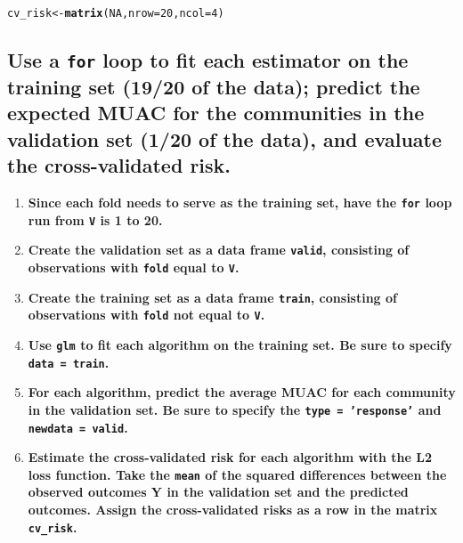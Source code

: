 \documentclass{article}\usepackage[]{graphicx}\usepackage[]{xcolor}
\makeatletter
\newcommand{\hlnum}[1]{\textcolor[rgb]{0.686,0.059,0.569}{#1}}%
\newcommand{\hlstd}[1]{\textcolor[rgb]{0.345,0.345,0.345}{#1}}%
\newcommand{\hlkwb}[1]{\textcolor[rgb]{0.69,0.353,0.396}{#1}}%
\newcommand{\hlkwc}[1]{\textcolor[rgb]{0.333,0.667,0.333}{#1}}%
\newcommand{\hlkwd}[1]{\textcolor[rgb]{0.737,0.353,0.396}{\textbf{#1}}}%
\newenvironment{kframe}{%
 \def\at@end@of@kframe{}%
 \ifinner\ifhmode%
  \def\at@end@of@kframe{\end{minipage}}%
  \begin{minipage}{\columnwidth}%
 \fi\fi%
 \def\FrameCommand##1{\hskip\@totalleftmargin \hskip-\fboxsep
 \colorbox{shadecolor}{##1}\hskip-\fboxsep
     \hskip-\linewidth \hskip-\@totalleftmargin \hskip\columnwidth}%
 \MakeFramed {\advance\hsize-\width
   \@totalleftmargin\z@ \linewidth\hsize
   \@setminipage}}%
 {\par\unskip\endMakeFramed%
 \at@end@of@kframe}
\newenvironment{knitrout}{}{} %
\makeatother
\begin{document}
\begin{knitrout}
\color{fgcolor}\begin{kframe}
\begin{alltt}
\hlstd{cv_risk} \hlkwb{<-} \hlkwd{matrix}\hlstd{(}\hlnum{NA}\hlstd{,} \hlkwc{nrow}\hlstd{=}\hlnum{20}\hlstd{,} \hlkwc{ncol}\hlstd{=}\hlnum{4}\hlstd{)}
\end{alltt}
\end{kframe}
\end{knitrout}


  \subsection{Use a \texttt{for} loop to fit each estimator on the training set (19/20 of the data); predict the expected MUAC for the communities in the validation set (1/20 of the data), and evaluate the cross-validated risk.}
  \begin{enumerate}
    \item \textbf{Since each fold needs to serve as the training set, have the \texttt{for} loop run from \texttt{V} is 1 to 20.}
    \item \textbf{Create the validation set as a data frame \texttt{valid}, consisting of observations with \texttt{fold} equal to \texttt{V}.}
    \item \textbf{Create the training set as a data frame \texttt{train}, consisting of observations with \texttt{fold} not equal to \texttt{V}.}
    \item \textbf{Use \texttt{glm} to fit each algorithm on the training set. Be sure to specify \texttt{data = train}.}
    \item \textbf{For each algorithm, predict the average MUAC for each community in the validation set. Be sure to specify the \texttt{type = 'response'} and \texttt{newdata = valid}.}
    \item \textbf{Estimate the cross-validated risk for each algorithm with the L2 loss function. Take the \texttt{mean} of the squared differences between the observed outcomes Y in the validation set and the predicted outcomes. Assign the cross-validated risks as a row in the matrix \texttt{cv\_risk}.}
  \end{enumerate}
  
\end{document}
